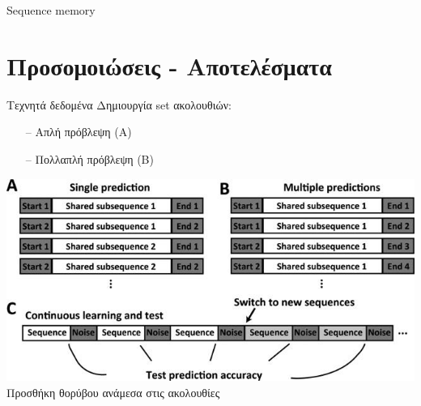 \documentclass[11pt,center]{beamer}
\begin{document}
\begin{frame}{Sequence memory}
\end{frame}

\section{Προσομοιώσεις - Αποτελέσματα}

	\begin{frame}{Τεχνητά δεδομένα}
		Δημιουργία set ακολουθιών:
		\begin{itemize}
			\item[--]Απλή πρόβλεψη (A)
			\item[--]Πολλαπλή πρόβλεψη (B)
		\end{itemize}
		\vfill
		\includegraphics[width=0.6 \textwidth,center]{../pics/sequences.jpg}
		\vfill
		\pause
		Προσθήκη θορύβου ανάμεσα στις ακολουθίες
	\end{frame}
\end{document}
